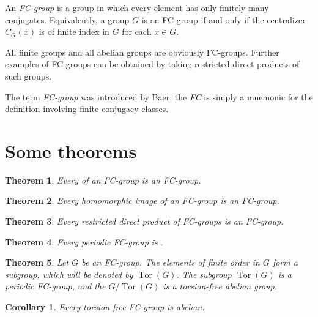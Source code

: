\documentclass[12pt]{article}
\newtheorem{corollary}{Corollary}
\newtheorem{theorem}{Theorem}
\DeclareMathOperator{\Tor}{Tor}
\begin{document}

An \emph{FC-group} is a group in which every element has only finitely many conjugates. Equivalently, a group $G$ is an FC-group if and only if the centralizer $C_G(x)$ is of finite index in $G$ for each $x\in G$.

All finite groups and all abelian groups are obviously FC-groups.
Further examples of FC-groups can be obtained by taking restricted direct products of such groups.

The term {\it FC-group} was introduced by Baer\cite{baer};
the {\it FC} is simply a mnemonic for the definition involving finite conjugacy classes.

\section{Some theorems}

\begin{theorem}
Every  of an FC-group is an FC-group.
\end{theorem}

\begin{theorem}
Every homomorphic image of an FC-group is an FC-group.
\end{theorem}

\begin{theorem}
Every restricted direct product of FC-groups is an FC-group.
\end{theorem}

\begin{theorem}
Every periodic FC-group is .
\end{theorem}

\begin{theorem}
Let $G$ be an FC-group.
The elements of finite order in $G$ form a subgroup,
which will be denoted by $\Tor(G)$.
The subgroup $\Tor(G)$ is a periodic FC-group,
and the  $G/\Tor(G)$ is a torsion-free abelian group.
\end{theorem}

\begin{corollary}
Every torsion-free FC-group is abelian.
\end{corollary}
\end{document}
